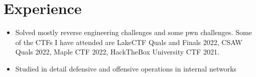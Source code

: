 \documentclass{resume}
\begin{document}



\section{Experience}

\begin{itemize}
  \item Solved mostly reverse engineering challenges and some pwn challenges. Some of the CTFs I have attended are LakeCTF Quals and Finals 2022, CSAW Quals 2022, Maple CTF 2022, HackTheBox University CTF 2021.
\end{itemize}

\begin{itemize}
  \item Studied in detail defensive and offensive operations in internal networks
\end{itemize}
\end{document}
